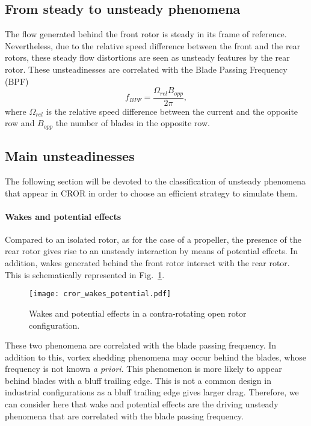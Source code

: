 
\subsection{From steady to unsteady phenomena}
\label{sub:cror_from_steady_to_unsteady_phenomena}

The flow generated behind the front rotor
is steady in its frame of reference. Nevertheless,
due to the relative speed difference between the
front and the rear rotors, these steady flow distortions are
seen as unsteady features by the rear rotor. 
These unsteadinesses are correlated with the Blade Passing Frequency (BPF)
\begin{equation}
	f_{BPF} = \frac{\Omega_{rel} B_{opp}}{2 \pi},
\end{equation}
where $\Omega_{rel}$ is the relative speed difference between
the current and the opposite row
and $B_{opp}$ the number of blades in the opposite row.

\subsection{Main unsteadinesses}
\label{sub:cror_main_unsteadinesses}

The following section will be devoted to the classification
of unsteady phenomena that appear in CROR in 
order to choose an efficient strategy to simulate them.

\paragraph{Wakes and potential effects}

Compared to an isolated rotor, as for the case of a propeller,
the presence of the rear rotor gives rise to an unsteady
interaction by means of potential effects. In addition, wakes generated
behind the front rotor interact with the rear rotor.
This is schematically represented in Fig.~\ref{fig:cror_wakes_potential}.
\begin{figure}[htp]
  \centering
  \texttt{[image: cror\_wakes\_potential.pdf]}
  \caption{Wakes and potential effects in a 
  contra-rotating open rotor configuration.}
  \label{fig:cror_wakes_potential}
\end{figure}
These two phenomena are correlated with the blade passing frequency.
In addition to this, vortex shedding phenomena may occur behind the blades, 
whose frequency is not known \emph{a priori}.
This phenomenon is more likely to appear behind blades with a bluff trailing edge.
This is not a common design in industrial configurations as a bluff trailing edge
gives larger drag. Therefore, we can consider here that 
wake and potential effects are the driving unsteady phenomena
that are correlated with the blade passing frequency.

